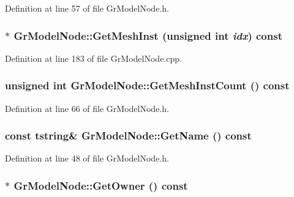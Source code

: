 Definition at line 57 of file GrModelNode.h.\hypertarget{class_gr_model_node_f5340d3bc303ba7f9211f89e791b013d}{
\subsubsection[{GetMeshInst}]{ $\ast$ GrModelNode::GetMeshInst (unsigned int {\em idx}) const}}
\label{class_gr_model_node_f5340d3bc303ba7f9211f89e791b013d}




Definition at line 183 of file GrModelNode.cpp.\hypertarget{class_gr_model_node_34fb55f7a4af15a5d6f241117f62012f}{
\subsubsection[{GetMeshInstCount}]{\setlength{\rightskip}{0pt plus 5cm}unsigned int GrModelNode::GetMeshInstCount () const}}
\label{class_gr_model_node_34fb55f7a4af15a5d6f241117f62012f}




Definition at line 66 of file GrModelNode.h.\hypertarget{class_gr_model_node_7cf09b5e2cf96cf2d1d797c2f569ea01}{
\subsubsection[{GetName}]{\setlength{\rightskip}{0pt plus 5cm}const {\bf tstring}\& GrModelNode::GetName () const}}
\label{class_gr_model_node_7cf09b5e2cf96cf2d1d797c2f569ea01}




Definition at line 48 of file GrModelNode.h.\hypertarget{class_gr_model_node_f03b5dd5229d1c4f8f6232fd6d419335}{
\subsubsection[{GetOwner}]{$\ast$ GrModelNode::GetOwner () const}}
\label{class_gr_model_node_f03b5dd5229d1c4f8f6232fd6d419335}




